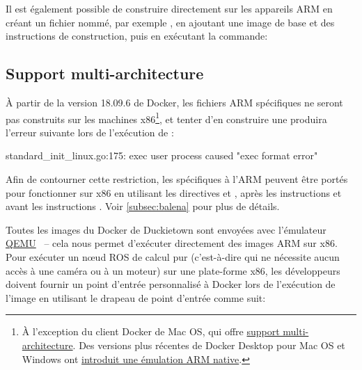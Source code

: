 %
Il est également possible de construire directement sur les appareils ARM en créant un fichier nommé, par exemple , en ajoutant une image de base et des instructions de construction, puis en exécutant la commande:

%
\subsection{Support multi-architecture}

À partir de la version 18.09.6 de Docker, les fichiers ARM spécifiques  ne seront pas construits sur les machines x86\footnote{À l'exception du client Docker de Mac OS, qui offre \href{https://docs.docker.com/docker-for-mac/multi-arch/}{support multi-architecture}. Des versions plus récentes de Docker Desktop pour Mac OS et Windows ont \href{https://engineering.docker.com/2019/04/multi-arch-images/}{introduit une émulation ARM native}.}, et tenter d'en construire une produira l'erreur suivante lors de l'exécution de :

\begin{pclisting}
standard_init_linux.go:175: exec user process caused "exec format error"
\end{pclisting}
%
Afin de contourner cette restriction, les  spécifiques à l'ARM peuvent être portés pour fonctionner sur x86 en utilisant les directives  et , après les instructions  et avant les instructions . Voir \autoref{subsec:balena} pour plus de détails.

Toutes les images du Docker de Duckietown sont envoyées avec l'émulateur \href{https://www.qemu.org}{QEMU}~\citep{bellard2005qemu} -- cela nous permet d'exécuter directement des images ARM sur x86. Pour exécuter un nœud ROS de calcul pur (c'est-à-dire qui ne nécessite aucun accès à une caméra ou à un moteur) sur une plate-forme x86, les développeurs doivent fournir un point d'entrée personnalisé à Docker lors de l'exécution de l'image en utilisant le drapeau de point d'entrée comme suit:

